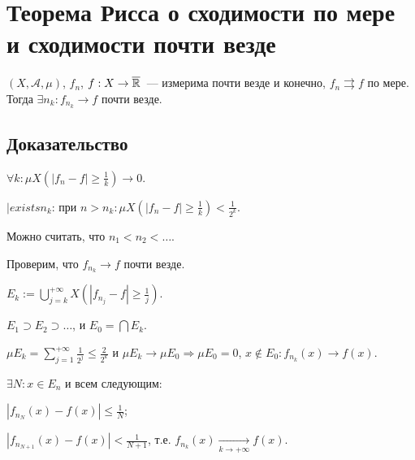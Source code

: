 \documentclass{article}
\begin{document}
    \section{Теорема Рисса о сходимости по мере и сходимости почти везде}
    
        $(X, \mathcal{A}, \mu)$, $f_n$, $f : X \rightarrow \overline{\mathbb{R}}$~--- измерима почти везде и конечно, $f_n \rightrightarrows f$ по мере. Тогда $\exists n_k : f_{n_k} \rightarrow f$ почти везде.
        
        \subsection{Доказательство}
        
            $\forall k : \mu X \left( | f_n - f| \geqslant \frac{1}{k} \right) \rightarrow 0$.
            
            $|exists n_k$: при $n > n_k : \mu X \left( | f_n - f | \geqslant \frac{1}{k} \right) < \frac{1}{2^k}$.
            
            Можно считать, что $n_1 < n_2 < \ldots$.
            
            Проверим, что $f_{n_k} \rightarrow f$ почти везде.
            
            $E_k := \bigcup\limits^{+\infty}_{j = k} X \left( | f_{n_j} - f | \geqslant \frac{1}{j} \right)$.
            
            $E_1 \supset E_2 \supset \ldots$, и $E_0 = \bigcap E_k$.
            
            $\mu E_k = \sum\limits^{+\infty}_{j = 1} \frac{1}{2^j} \leqslant \frac{2}{2^k}$ и $\mu E_k \rightarrow \mu E_0 \Rightarrow \mu E_0 = 0$, $x \notin E_0 : f_{n_k}(x) \rightarrow f(x)$.
            
            $\exists N : x \in E_n$ и всем следующим: 
            
            $|f_{n_N} (x) - f(x) | \leqslant \frac{1}{N}$;
            
            $|f_{n_{N + 1}} (x) - f(x) | < \frac{1}{N + 1}$, т.е. $f_{n_k}(x) \xrightarrow[k \rightarrow +\infty]{} f(x)$.
            
\end{document}
